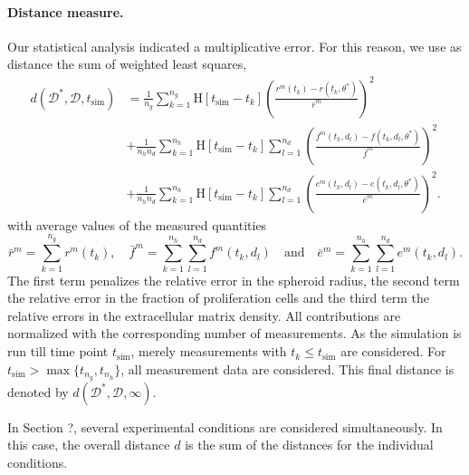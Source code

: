 \documentclass[10pt,letterpaper]{article}
\newcommand{\Heaviside}[1]{{\mathrm{H}\!\left[#1\right]}}
\newcommand{\jh}[1]{{\color{red}#1}}
\begin{document}
\paragraph{Distance measure.}
Our statistical analysis indicated a multiplicative error. For this reason, we use as distance the sum of weighted least squares,
\begin{equation*}
\begin{aligned}
d(\mathcal{D}^*,\mathcal{D},t_{\text{sim}}) 
&= \frac{1}{n_g}\sum_{k=1}^{n_g} \Heaviside{t_{\text{sim}} - t_k} \! \left(\frac{r^m(t_k) - r(t_k,\theta^*)}{\bar{r}^m}\right)^2 \\
&+ \frac{1}{n_h n_d}\sum_{k=1}^{n_h} \Heaviside{t_{\text{sim}} - t_k} \sum_{l=1}^{n_d} \left(\frac{f^m(t_k,d_l) - f(t_k,d_l,\theta^*)}{\bar{f}^m}\right)^2 \\
&+ \frac{1}{n_h n_d} \sum_{k=1}^{n_h} \Heaviside{t_{\text{sim}} - t_k} \sum_{l=1}^{n_d} \left(\frac{e^m(t_k,d_l) - e(t_k,d_l,\theta^*)}{\bar{e}^m}\right)^2.
\end{aligned}
\end{equation*}
with average values of the measured quantities
\begin{equation*}
\bar{r}^m = \sum_{k=1}^{n_g} r^m(t_k), \quad
\bar{f}^m = \sum_{k=1}^{n_h} \sum_{l=1}^{n_d} f^m(t_k,d_l) \quad \text{and} \quad
\bar{e}^m = \sum_{k=1}^{n_h} \sum_{l=1}^{n_d} e^m(t_k,d_l).
\end{equation*}
The first term penalizes the relative error in the spheroid radius, the second term the relative error in the fraction of proliferation cells and the third term the relative errors in the extracellular matrix density. All contributions are normalized with the corresponding number of measurements. As the simulation is run till time point $t_{\text{sim}}$, merely measurements with $t_k \leq t_{\text{sim}}$ are considered. For $t_{\text{sim}} > \max\{t_{n_g},t_{n_h}\}$, all measurement data are considered. This final distance is denoted by $d(\mathcal{D}^*,\mathcal{D},\infty)$.

In Section \jh{?}, several experimental conditions are considered simultaneously. In this case, the overall distance $d$ is the sum of the distances for the individual conditions.

%
\end{document}
